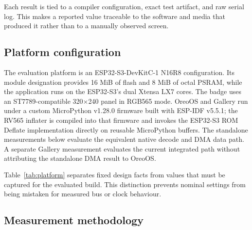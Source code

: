 \documentclass[11pt,twocolumn]{article}
\begin{document}
\begin{table}[!t]
\centering
\caption{Measured RV565 v6 performance.}
\label{tab:results}
\end{table}

Each result is tied to a compiler configuration, exact test artifact, and raw
serial log.  This makes a reported value traceable to the software and media
that produced it rather than to a manually observed screen.

\subsection{Platform configuration}

The evaluation platform is an ESP32-S3-DevKitC-1 N16R8 configuration.  Its
module designation provides 16 MiB of flash and 8 MiB of octal PSRAM, while
the application runs on the ESP32-S3's dual Xtensa LX7 cores.  The badge uses
an ST7789-compatible 320$\times$240 panel in RGB565 mode.  OreoOS and Gallery
run under a custom MicroPython v1.28.0 firmware built with ESP-IDF v5.5.1; the
RV565 inflater is compiled into that firmware and invokes the ESP32-S3 ROM
Deflate implementation directly on reusable MicroPython buffers.  The
standalone measurements below evaluate the equivalent native decode and DMA
data path.  A separate Gallery measurement evaluates the current integrated
path without attributing the standalone DMA result to OreoOS.

Table~\ref{tab:platform} separates fixed design facts from values that must be
captured for the evaluated build.  This distinction prevents nominal settings
from being mistaken for measured bus or clock behaviour.

\subsection{Measurement methodology}
\end{document}
